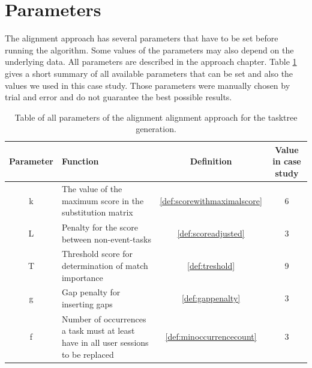 \section{Parameters}
The alignment approach has several parameters that have to be set before running the algorithm. Some values of the parameters may also depend on the underlying data.
All parameters are described in the approach chapter. Table \ref{tab:parameters} gives a short summary of all available parameters that can be set and also the values
we used in this case study. Those parameters were manually chosen by trial and error and do not guarantee the best possible results. 

\begin{table}
	\begin{tabularx}{\textwidth}{|c|X|c|c|}
	   \hline
	   \textbf{Parameter} & \textbf{Function} & \textbf{Definition} & \textbf{Value in case study}\\
	     \hline
	       k & The value of the maximum score in the substitution matrix& \ref{def:scorewithmaximalscore}& 6 \\
	       L & Penalty for the score between non-event-tasks & \ref{def:scoreadjusted} & 3\\
	       T & Threshold score for determination of match importance & \ref{def:treshold} &9\\
	       g & Gap penalty for inserting gaps & \ref{def:gappenalty} &3\\
	       f & Number of occurrences a task must at least have in all user sessions to be replaced & \ref{def:minoccurrencecount} &3\\
	       \hline
 \end{tabularx}
 \caption{Table of all parameters of the alignment alignment approach for the tasktree generation.}
 \label{tab:parameters}
 \end{table}

 
